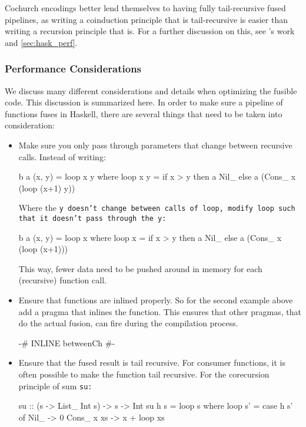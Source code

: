 Cochurch encodings better lend themselves to having fully tail-recursive fused pipelines, as writing a coinduction principle that is tail-recursive is easier than writing a recursion principle that is.
For a further discussion on this, see \cite{Breitner2018}'s work and \autoref{sec:hask_perf}.


\subsubsection{Performance Considerations}\label{sec:hs_perf}
We discuss many different considerations and details when optimizing the fusible code.
This discussion is summarized here.
In order to make sure a pipeline of functions fuses in Haskell, there are several things that need to be taken into consideration:
\begin{itemize}[noitemsep]
    \item Make sure you only pass through parameters that change between recursive calls. Instead of writing:
    \begin{spec}
b a (x, y) = loop x y
  where loop x y = if x > y
                   then a Nil_
                   else a (Cons_ x (loop (x+1) y))
    \end{spec}
    Where the \tt{y} doesn't change between calls of \tt{loop}, modify \tt{loop} such that it doesn't pass through the \tt{y}:
    \begin{spec}
b a (x, y) = loop x
  where loop x = if x > y
                 then a Nil_
                 else a (Cons_ x (loop (x+1)))
    \end{spec}
    This way, fewer data need to be pushed around in memory for each (recursive) function call.
    \item Ensure that functions are inlined properly. So for the second example above add a pragma that inlines the function.
    This ensures that other pragmas, that  do the actual fusion, can fire during the compilation process.
    \begin{spec}
        {-# INLINE betweenCh #-}
    \end{spec}
    \item Ensure that the fused result is tail recursive.
    For consumer functions, it is often possible to make the function tail recursive.
    For the corecursion principle of sum \tt{su}:
    \begin{spec}
su :: (s -> List_ Int s) -> s -> Int
su h s = loop s
  where loop s' = case h s' of
          Nil_ -> 0
          Cons_ x xs -> x + loop xs
    \end{spec}

\end{itemize}
